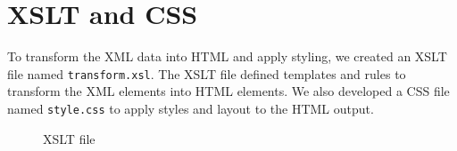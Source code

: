 \documentclass[12pt]{report}
\begin{document}
\section{XSLT and CSS}
To transform the XML data into HTML and apply styling, we created an XSLT file named \texttt{transform.xsl}. The XSLT file defined templates and rules to transform the XML elements into HTML elements. We also developed a CSS file named \texttt{style.css} to apply styles and layout to the HTML output.
\begin{figure}[htbp]
	\centering
	\caption{XSLT file}
	\label{fig:multiple-screenshots2}
  \end{figure}
\end{document}

